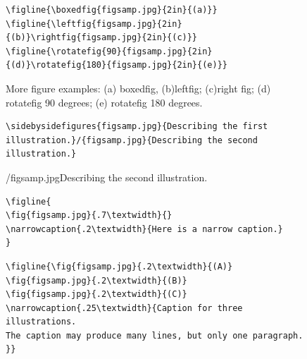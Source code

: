 \documentclass[reprint]{JASAnew}
\begin{document}
\begin{figure}
\baselineskip=12pt
\begin{verbatim}
\figline{\boxedfig{figsamp.jpg}{2in}{(a)}}
\figline{\leftfig{figsamp.jpg}{2in}{(b)}\rightfig{figsamp.jpg}{2in}{(c)}}
\figline{\rotatefig{90}{figsamp.jpg}{2in}{(d)}\rotatefig{180}{figsamp.jpg}{2in}{(e)}}
\end{verbatim}




\caption{More figure examples: (a) boxedfig, 
(b)leftfig; (c)right fig; (d) rotatefig 90 degrees;
(e) rotatefig 180 degrees. }

\end{figure}








\begin{figure}
\baselineskip=12pt
\begin{verbatim}
\sidebysidefigures{figsamp.jpg}{Describing the first
illustration.}/{figsamp.jpg}{Describing the second illustration.}
\end{verbatim}

/{figsamp.jpg}{Describing the second illustration.}
\end{figure}


\begin{figure}
\baselineskip=12pt
\begin{verbatim}
\figline{
\fig{figsamp.jpg}{.7\textwidth}{}
\narrowcaption{.2\textwidth}{Here is a narrow caption.}
}
\end{verbatim}
\end{figure}


\begin{figure}
\baselineskip=12pt
\begin{verbatim}
\figline{\fig{figsamp.jpg}{.2\textwidth}{(A)}
\fig{figsamp.jpg}{.2\textwidth}{(B)}
\fig{figsamp.jpg}{.2\textwidth}{(C)}
\narrowcaption{.25\textwidth}{Caption for three illustrations. 
The caption may produce many lines, but only one paragraph.
}}
\end{verbatim}
\end{figure}
\end{document}
